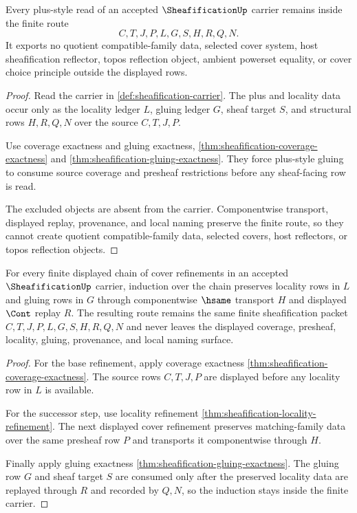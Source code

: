 \begin{theorem}
\label{thm:sheafification-plus-nonescape}
Every plus-style read of an accepted $\SheafificationUp$ carrier remains inside the finite route
$$
C,T,J,P,L,G,S,H,R,Q,N .
$$
It exports no quotient compatible-family data, selected cover system, host sheafification reflector, topos reflection object, ambient powerset equality, or cover choice principle outside the displayed rows.
\end{theorem}
\begin{proof}
Read the carrier in \autoref{def:sheafification-carrier}. The plus and locality data occur only as the locality ledger $L$, gluing ledger $G$, sheaf target $S$, and structural rows $H,R,Q,N$ over the source $C,T,J,P$.

Use coverage exactness and gluing exactness, \autoref{thm:sheafification-coverage-exactness} and \autoref{thm:sheafification-gluing-exactness}. They force plus-style gluing to consume source coverage and presheaf restrictions before any sheaf-facing row is read.

The excluded objects are absent from the carrier. Componentwise transport, displayed replay, provenance, and local naming preserve the finite route, so they cannot create quotient compatible-family data, selected covers, host reflectors, or topos reflection objects.
\end{proof}

\begin{theorem}
\label{thm:sheafification-cover-refinement-finite-induction}
For every finite displayed chain of cover refinements in an accepted $\SheafificationUp$ carrier, induction over the chain preserves locality rows in $L$ and gluing rows in $G$ through componentwise $\hsame$ transport $H$ and displayed $\Cont$ replay $R$. The resulting route remains the same finite sheafification packet $C,T,J,P,L,G,S,H,R,Q,N$ and never leaves the displayed coverage, presheaf, locality, gluing, provenance, and local naming surface.
\end{theorem}
\begin{proof}
For the base refinement, apply coverage exactness \autoref{thm:sheafification-coverage-exactness}. The source rows $C,T,J,P$ are displayed before any locality row in $L$ is available.

For the successor step, use locality refinement \autoref{thm:sheafification-locality-refinement}. The next displayed cover refinement preserves matching-family data over the same presheaf row $P$ and transports it componentwise through $H$.

Finally apply gluing exactness \autoref{thm:sheafification-gluing-exactness}. The gluing row $G$ and sheaf target $S$ are consumed only after the preserved locality data are replayed through $R$ and recorded by $Q,N$, so the induction stays inside the finite carrier.
\end{proof}

